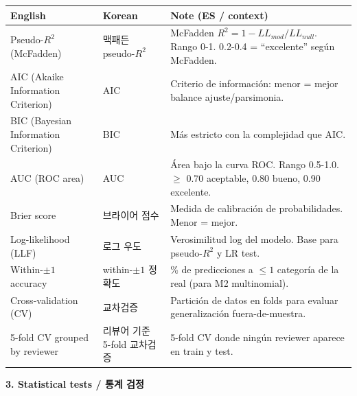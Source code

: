 \documentclass[10pt,a4paper]{article}
\begin{document}
\vspace{4pt}

\footnotesize

\begin{longtable}{@{}p{3.6cm} p{3.5cm} p{9cm}@{}}
\toprule
\textbf{English} & \textbf{Korean} & \textbf{Note (ES / context)} \\
\midrule
Pseudo-$R^2$ (McFadden)     & 맥패든 pseudo-$R^2$        & McFadden $R^2 = 1 - LL_{mod}/LL_{null}$. Rango 0-1. 0.2-0.4 = ``excelente'' según McFadden. \\
AIC (Akaike Information Criterion) & AIC                 & Criterio de información: menor = mejor balance ajuste/parsimonia. \\
BIC (Bayesian Information Criterion) & BIC                 & Más estricto con la complejidad que AIC. \\
AUC (ROC area)              & AUC                           & Área bajo la curva ROC. Rango 0.5-1.0. $\ge$ 0.70 aceptable, 0.80 bueno, 0.90 excelente. \\
Brier score                  & 브라이어 점수                 & Medida de calibración de probabilidades. Menor = mejor. \\
Log-likelihood (LLF)         & 로그 우도                      & Verosimilitud log del modelo. Base para pseudo-$R^2$ y LR test. \\
Within-$\pm 1$ accuracy      & within-$\pm 1$ 정확도         & \% de predicciones a $\le 1$ categoría de la real (para M2 multinomial). \\
Cross-validation (CV)        & 교차검증                       & Partición de datos en folds para evaluar generalización fuera-de-muestra. \\
5-fold CV grouped by reviewer & 리뷰어 기준 5-fold 교차검증  & 5-fold CV donde ningún reviewer aparece en train y test. \\
\bottomrule
\end{longtable}

\vspace{10pt}
\noindent\normalsize\textbf{\large 3. Statistical tests / 통계 검정}

\vspace{4pt}

\footnotesize
\end{document}
